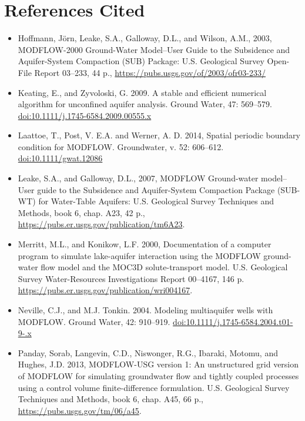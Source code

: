 \documentclass[11pt,twoside,twocolumn]{usgsreport}
\begin{document}
\section{References Cited}

\begin{itemize}
\item Hoffmann, J{\"o}rn, Leake, S.A., Galloway, D.L., and Wilson, A.M., 2003, MODFLOW-2000 Ground-Water Model--User Guide to the Subsidence and Aquifer-System Compaction (SUB) Package: U.S. Geological Survey Open-File Report 03–233, 44 p.,  \url{https://pubs.usgs.gov/of/2003/ofr03-233/}

\item Keating, E., and Zyvoloski, G. 2009. A stable and efficient numerical algorithm for unconfined aquifer analysis. Ground Water, 47: 569--579. \href{https://doi.org/10.1111/j.1745-6584.2009.00555.x}{doi:10.1111/j.1745-6584.2009.00555.x}

\item Laattoe, T., Post, V. E.A. and Werner, A. D. 2014, Spatial periodic boundary condition for MODFLOW. Groundwater, v. 52: 606--612. \href{https://doi.org/10.1111/gwat.12086}{doi:10.1111/gwat.12086}

\item Leake, S.A., and Galloway, D.L., 2007, MODFLOW Ground-water model--User guide to the Subsidence and Aquifer-System Compaction Package (SUB-WT) for Water-Table Aquifers: U.S. Geological Survey Techniques and Methods, book 6, chap. A23, 42 p., \url{https://pubs.er.usgs.gov/publication/tm6A23}.

\item Merritt, M.L., and Konikow, L.F. 2000, Documentation of a computer program to simulate lake-aquifer interaction using the MODFLOW ground-water flow model and the MOC3D solute-transport model. U.S. Geological Survey Water-Resources Investigations Report 00--4167, 146 p. \url{https://pubs.er.usgs.gov/publication/wri004167}.

\item Neville, C.J., and M.J. Tonkin. 2004. Modeling multiaquifer wells with MODFLOW.  Ground Water, 42: 910--919. \href{https://doi.org/10.1111/j.1745-6584.2004.t01-9-.x}{doi:10.1111/j.1745-6584.2004.t01-9-.x}

\item Panday, Sorab, Langevin, C.D., Niswonger, R.G., Ibaraki, Motomu, and Hughes, J.D. 2013, MODFLOW-USG version 1: An unstructured grid version of MODFLOW for simulating groundwater flow and tightly coupled processes using a control volume finite-difference formulation. U.S. Geological Survey Techniques and Methods, book 6, chap. A45, 66 p., \url{https://pubs.usgs.gov/tm/06/a45}.


\end{itemize}
\end{document}
